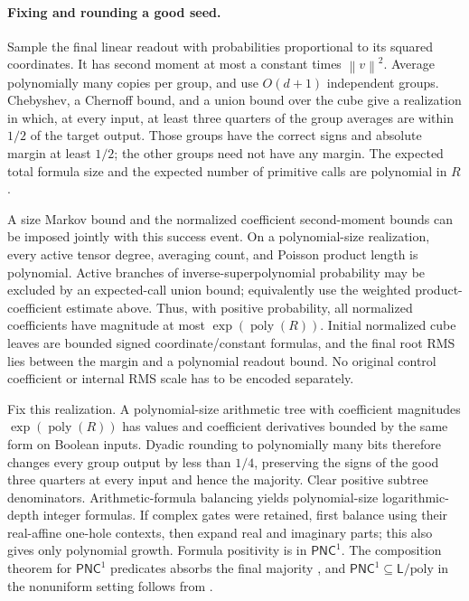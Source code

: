 \documentclass[11pt]{article}
\theoremstyle{remark}\newtheorem{remark}[theorem]{Remark}
\newcommand{\poly}{\operatorname{poly}}
\newcommand{\PNC}{\mathsf{PNC}}
\newcommand{\Lpoly}{\mathsf L/\mathrm{poly}}
\newcommand{\norm}[1]{\left\lVert #1\right\rVert}
\begin{document}
\paragraph{Fixing and rounding a good seed.}
Sample the final linear readout with probabilities proportional to its
squared coordinates. It has second moment at most a constant times
$\norm v^2$. Average polynomially many copies per group, and use $O(d+1)$
independent groups. Chebyshev, a Chernoff bound, and a union bound over the
cube give a realization in which, at every input, at least three quarters
of the group averages are within $1/2$ of the target output. Those groups
have the correct signs and absolute margin at least $1/2$; the other
groups need not have any margin. The expected total formula
size and the expected number of primitive calls are polynomial in $R$.

A size Markov bound and the normalized coefficient second-moment bounds
can be imposed jointly with this success event. On a polynomial-size
realization, every active tensor degree, averaging count, and Poisson
product length is polynomial. Active branches of inverse-superpolynomial
probability may be excluded by an expected-call union bound; equivalently
use the weighted product-coefficient estimate above. Thus, with positive
probability, all normalized coefficients have magnitude at most
$\exp(\poly(R))$. Initial normalized cube leaves are bounded signed
coordinate/constant formulas, and the final root RMS lies between the
margin and a polynomial readout bound. No original control coefficient
or internal RMS scale has to be encoded separately.

Fix this realization. A polynomial-size arithmetic tree with coefficient
magnitudes $\exp(\poly(R))$ has values and coefficient derivatives bounded
by the same form on Boolean inputs. Dyadic rounding to polynomially many
bits therefore changes every group output by less than $1/4$, preserving
the signs of the good three quarters at every input and hence the majority.
Clear positive subtree denominators. Arithmetic-formula
balancing yields polynomial-size logarithmic-depth integer formulas.
If complex gates were retained, first balance using their real-affine
one-hole contexts, then expand real and imaginary parts; this also gives
only polynomial growth. Formula positivity is in $\PNC^1$.
The composition theorem for $\PNC^1$ predicates absorbs the final majority
\cite[Theorem~4.2]{datta}, and $\PNC^1\subseteq\Lpoly$ in the nonuniform
setting follows from \cite[Proposition~2.4]{datta}.
\end{document}
